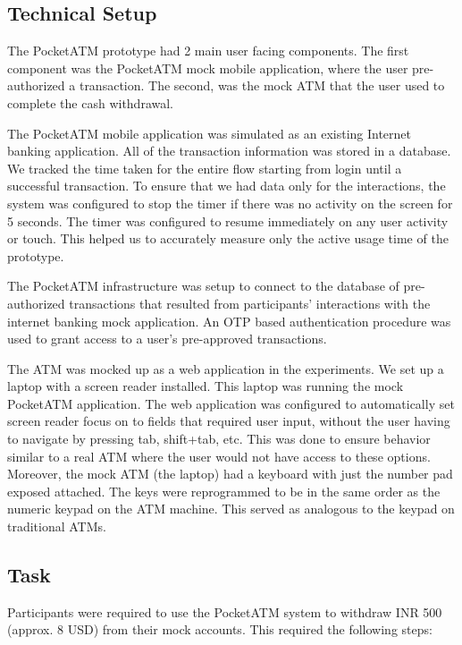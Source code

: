 \subsection{Technical Setup}
\label{ssec:technicalsetup}

The PocketATM prototype had 2 main user facing components. The first component was the PocketATM mock mobile application, where the user pre-authorized a transaction. The second, was the mock ATM that the user used to complete the cash withdrawal. 

The PocketATM mobile application was simulated as an existing Internet banking application. All of the transaction information was stored in a database. We tracked the time taken for the entire flow starting from login until a successful transaction. To ensure that we had data only for the interactions, the system was configured to stop the timer if there was no activity on the screen for 5 seconds. The timer was configured to resume immediately on any user activity or touch. This helped us to accurately measure only the active usage time of the prototype. 

The PocketATM infrastructure was setup to connect to the database of pre-authorized transactions that resulted from participants' interactions with the internet banking mock application. An OTP based authentication procedure was used to grant access to a user's pre-approved transactions. 

The ATM was mocked up as a web application in the experiments. We set up a laptop with a screen reader installed. This laptop was running the mock PocketATM application. The web application was configured to automatically set screen reader focus on to fields that required user input, without the user having to navigate by pressing tab, shift+tab, etc. This was done to ensure behavior similar to a real ATM where the user would not have access to these options. Moreover, the mock ATM (the laptop) had a keyboard with just the number pad exposed attached. The keys were reprogrammed to be in the same order as the numeric keypad on the ATM machine. This served as analogous to the keypad on traditional ATMs.

\subsection{Task}
\label{ssec:task}

Participants were required to use the PocketATM system to withdraw INR 500 (approx. 8 USD) from their mock accounts. This required the following steps:

